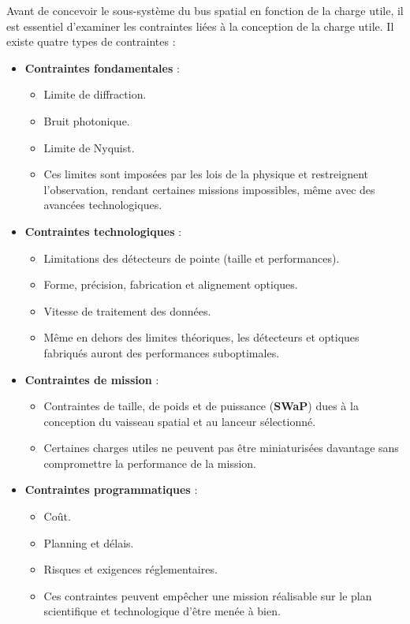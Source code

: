 Avant de concevoir le sous-système du bus spatial en fonction de la charge utile, il est essentiel d'examiner les contraintes liées à la conception de la charge utile. Il existe quatre types de contraintes :

\begin{itemize}
    \item \textbf{Contraintes fondamentales} :  
    \begin{itemize}
        \item Limite de diffraction.  
        \item Bruit photonique.  
        \item Limite de Nyquist.  
        \item Ces limites sont imposées par les lois de la physique et restreignent l'observation, rendant certaines missions impossibles, même avec des avancées technologiques.  
    \end{itemize}

    \item \textbf{Contraintes technologiques} :  
    \begin{itemize}
        \item Limitations des détecteurs de pointe (taille et performances).  
        \item Forme, précision, fabrication et alignement optiques.  
        \item Vitesse de traitement des données.  
        \item Même en dehors des limites théoriques, les détecteurs et optiques fabriqués auront des performances suboptimales.  
    \end{itemize}

    \item \textbf{Contraintes de mission} :  
    \begin{itemize}
        \item Contraintes de taille, de poids et de puissance (\textbf{SWaP}) dues à la conception du vaisseau spatial et au lanceur sélectionné.  
        \item Certaines charges utiles ne peuvent pas être miniaturisées davantage sans compromettre la performance de la mission.  
    \end{itemize}

    \item \textbf{Contraintes programmatiques} :  
    \begin{itemize}
        \item Coût.  
        \item Planning et délais.  
        \item Risques et exigences réglementaires.  
        \item Ces contraintes peuvent empêcher une mission réalisable sur le plan scientifique et technologique d’être menée à bien.  
    \end{itemize}
\end{itemize}

